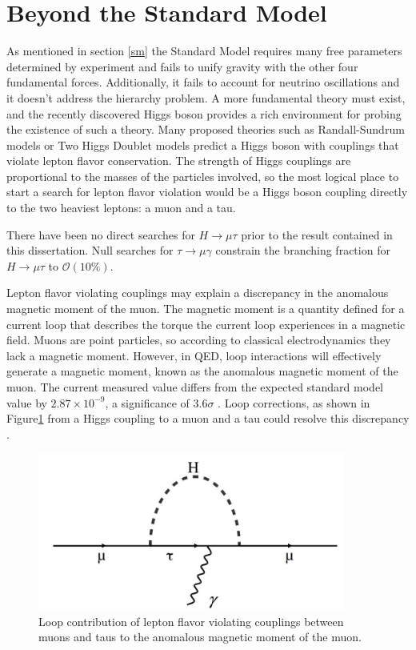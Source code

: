 \documentclass[oneside, letterpaper, oldfontcommands]{memoir}
\begin{document}
\section{Beyond the Standard Model}\label{BSM}

\qquad As mentioned in section \ref{sm} the Standard Model requires many free parameters determined by experiment and fails to unify gravity with the other four fundamental forces. Additionally, it fails to account for neutrino oscillations\cite{Fukuda:1998mi}\cite{Ahmad:2001an}\cite{Ahmad:2002jz} and it doesn't address the hierarchy problem. \cite{ArkaniHamed:1998rs} A more fundamental theory must exist, and the recently discovered Higgs boson provides a rich environment for probing the existence of such a theory. Many proposed theories such as Randall-Sundrum models \cite{Randall:1999ee} or Two Higgs Doublet models \cite{Branco:2011iw} predict a Higgs boson with couplings that violate lepton flavor conservation. The strength of Higgs couplings are proportional to the masses of the particles involved, so the most logical place to start a search for lepton flavor violation would be a Higgs boson coupling directly to the two heaviest leptons: a muon and a tau.

\qquad There have been no direct searches for $H \rightarrow \mu\tau$ prior to the result contained in this dissertation. Null searches for $\tau \rightarrow \mu\gamma$ constrain the branching fraction for $H \rightarrow \mu\tau$ to $\mathcal{O}(10\%)$.\cite{Harnik:2012pb}

\qquad Lepton flavor violating couplings may explain a discrepancy in the anomalous magnetic moment of the muon. The magnetic moment is a quantity defined for a current loop that describes the torque the current loop experiences in a magnetic field. Muons are point particles, so according to classical electrodynamics they lack a magnetic moment. However, in QED, loop interactions will effectively generate a magnetic moment, known as the anomalous magnetic moment of the muon. The current measured value differs from the expected standard model value by $2.87 \times 10^{-9}$, a significance of $3.6 \sigma$ \cite{Bennett:2004pv}\cite{Agashe:2014kda}. Loop corrections, as shown in Figure\ref{fig:mutauloop} from a Higgs coupling to a muon and a tau could resolve this discrepancy \cite{Harnik:2012pb}.

\begin{figure}[here]
\includegraphics[width=0.9\textwidth]{mutauloop.jpg}
\caption{Loop contribution of lepton flavor violating couplings between muons and taus to the anomalous magnetic moment of the muon.}
\label{fig:mutauloop}
\end{figure}
\end{document}
